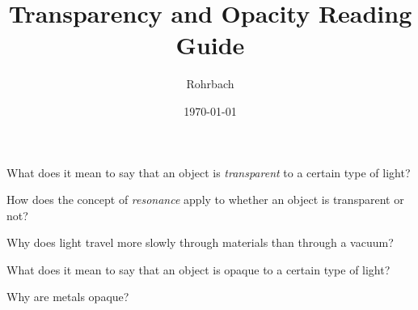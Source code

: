 \documentclass[10pt]{exam}
\title{Transparency and Opacity Reading Guide}
\author{Rohrbach}
\date{\today}
\begin{document}
\maketitle

\begin{questions}


\question
  What does it mean to say that an object is \emph{transparent} to a certain type of light?
  \vs

\question
  How does the concept of \emph{resonance} apply to whether an object is transparent or not?
  \vs 

\question
  Why does light travel more slowly through materials than through a vacuum?
  \vs 


\question
  What does it mean to say that an object is opaque to a certain type of light?
  \vs 

\question
  Why are metals opaque?
  \vs



\end{questions}
\end{document}
